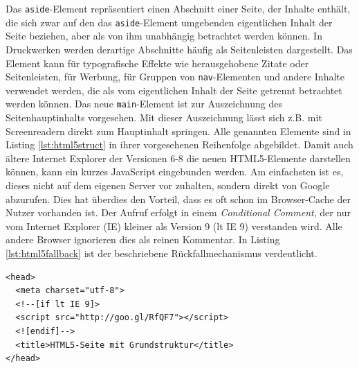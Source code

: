 Das \texttt{aside}-Element repräsentiert einen Abschnitt einer Seite, der Inhalte enthält, die sich zwar auf den das \texttt{aside}-Element umgebenden eigentlichen Inhalt der Seite beziehen, aber als von ihm unabhängig betrachtet werden können. In Druckwerken werden derartige Abschnitte häufig als Seitenleisten dargestellt. Das Element kann für typografische Effekte wie herausgehobene Zitate oder Seitenleisten, für Werbung, für Gruppen von \texttt{nav}-Elementen und andere Inhalte verwendet werden, die als vom eigentlichen Inhalt der Seite getrennt betrachtet werden können.\grqq{}\cite[S.43]{PilgDurc2011} Das neue \texttt{main}-Element ist zur Auszeichnung des Seitenhauptinhalts vorgesehen. Mit dieser Auszeichnung lässt sich z.B. mit Screenreadern direkt zum Hauptinhalt springen.  Alle genannten Elemente sind in Listing \ref{lst:html5struct} in ihrer vorgesehenen Reihenfolge abgebildet. \glqq Damit auch ältere Internet Explorer der Versionen 6-8 die neuen HTML5-Elemente darstellen können, kann ein kurzes JavaScript eingebunden werden. Am einfachsten ist es, dieses nicht auf dem eigenen Server vor zuhalten, sondern direkt von Google abzurufen. Dies hat überdies den Vorteil, dass es oft schon im Browser-Cache der Nutzer vorhanden ist. Der Aufruf erfolgt in einem \textit{Conditional Comment}, der nur vom Internet Explorer (IE) kleiner als Version 9 (lt IE 9) verstanden wird. Alle andere Browser ignorieren dies als reinen Kommentar.\grqq{}\cite{SelfHtml20143} In Listing \ref{lst:html5fallback}	 ist der beschriebene Rückfallmechanismus verdeutlicht.

\vspace{1em}
\begin{lstlisting}[language=HTML5, caption=HTML5 Internet Explorer Fallback, label=lst:html5fallback]
<head>
  <meta charset="utf-8">
  <!--[if lt IE 9]>
  <script src="http://goo.gl/RfQF7"></script>
  <![endif]-->
  <title>HTML5-Seite mit Grundstruktur</title>
</head>
\end{lstlisting}
	
